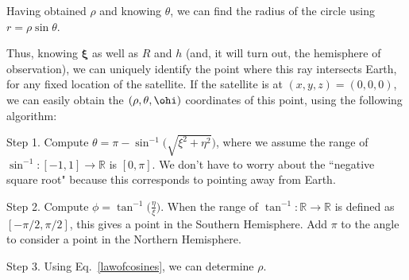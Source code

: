 \documentclass{article}
\begin{document}
Having obtained $\rho$ and knowing $\theta$, we can find the radius of the circle using $r = \rho \sin \theta$.

Thus, knowing $\bm{\xi}$ as well as $R$ and $h$ (and, it will turn out, the hemisphere of observation), we can uniquely identify the point where this ray intersects Earth, for any fixed location of the satellite. If the satellite is at $(x,y,z) = (0,0,0)$, we can easily obtain the $(\rho,\theta,\ohi)$ coordinates of this point, using the following algorithm:

Step 1. Compute $\theta = \pi - \sin^{-1}\big(\sqrt{\xi^2 + \eta^2}\big)$, where we assume the range of $\sin^{-1}: [-1,1] \rightarrow \mathbb{R}$ is $[0, \pi]$. We don't have to worry about the ``negative square root" because this corresponds to pointing away from Earth.

Step 2. Compute $\phi = \tan^{-1}\big(\frac{\eta}{\xi}\big)$. When the range of $\tan^{-1}: \mathbb{R} \rightarrow \mathbb{R}$ is defined as $[-\pi/2, \pi/2]$, this gives a point in the Southern Hemisphere. Add $\pi$ to the angle to consider a point in the Northern Hemisphere.

Step 3. Using Eq.~\eqref{lawofcosines}, we can determine $\rho$.




\end{document}
